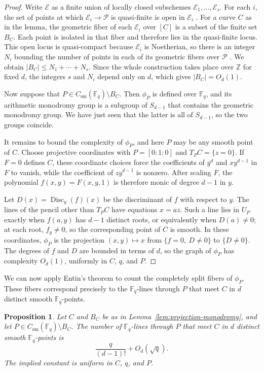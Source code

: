 \documentclass[12pt,reqno]{amsart}
\newtheorem{proposition}[theorem]{Proposition}
\theoremstyle{definition}
\theoremstyle{remark}
\newcommand{\Fq}{\mathbb{F}_q}
\begin{document}
\begin{proof}
Write $\mathcal E$ as a finite union of locally closed subschemes $\mathcal E_1,\ldots,\mathcal E_s$. For each $i$, the set of points at which $\mathcal E_i\to\mathcal P$ is quasi-finite is open in $\mathcal E_i$ \cite[Tag~01TI]{Stacks}. For a curve $C$ as in the lemma, the geometric fiber of each $\mathcal E_i$ over $[C]$ is a subset of the finite set $B_C$. Each point is isolated in that fiber and therefore lies in the quasi-finite locus. This open locus is quasi-compact because $\mathcal E_i$ is Noetherian, so there is an integer $N_i$ bounding the number of points in each of its geometric fibers over $\mathcal P$ \cite[Tag~03JA]{Stacks}. We obtain $|B_C|\leq N_1+\cdots+N_s$. Since the whole construction takes place over $\mathbb Z$ for fixed $d$, the integers $s$ and $N_i$ depend only on $d$, which gives $|B_C|=O_d(1)$.

Now suppose that $P\in C_{\mathrm{sm}}(\Fq)\setminus B_C$. Then $\phi_P$ is defined over $\Fq$, and its arithmetic monodromy group is a subgroup of $S_{d-1}$ that contains the geometric monodromy group. We have just seen that the latter is all of $S_{d-1}$, so the two groups coincide.

It remains to bound the complexity of $\phi_P$, and here $P$ may be any smooth point of $C$. Choose projective coordinates with $P=[0:1:0]$ and $T_PC=\{z=0\}$. If $F=0$ defines $C$, these coordinate choices force the coefficients of $y^d$ and $xy^{d-1}$ in $F$ to vanish, while the coefficient of $zy^{d-1}$ is nonzero. After scaling $F$, the polynomial $f(x,y)=F(x,y,1)$ is therefore monic of degree $d-1$ in $y$.

Let $D(x)=\operatorname{Disc}_y(f)(x)$ be the discriminant of $f$ with respect to $y$. The lines of the pencil other than $T_PC$ have equations $x=az$. Such a line lies in $U_P$ exactly when $f(a,y)$ has $d-1$ distinct roots, or equivalently when $D(a)\neq0$; at each root, $f_y\neq0$, so the corresponding point of $C$ is smooth. In these coordinates, $\phi_P$ is the projection $(x,y)\mapsto x$ from $\{f=0,\ D\neq0\}$ to $\{D\neq0\}$. The degrees of $f$ and $D$ are bounded in terms of $d$, so the graph of $\phi_P$ has complexity $O_d(1)$, uniformly in $C$, $q$, and $P$.
\end{proof}

We can now apply Entin's theorem to count the completely split fibers of $\phi_P$. These fibers correspond precisely to the $\Fq$-lines through $P$ that meet $C$ in $d$ distinct smooth $\Fq$-points.

\begin{proposition}\label{prop:degree}
Let $C$ and $B_C$ be as in Lemma~\ref{lem:projection-monodromy}, and let
$P\in C_{\mathrm{sm}}(\Fq)\setminus B_C$. The number of $\Fq$-lines
through $P$ that meet $C$ in $d$ distinct smooth $\Fq$-points is
\[
\frac{q}{(d-1)!}+O_d(\sqrt q).
\]
The implied constant is uniform in $C$, $q$, and $P$.
\end{proposition}
\end{document}
